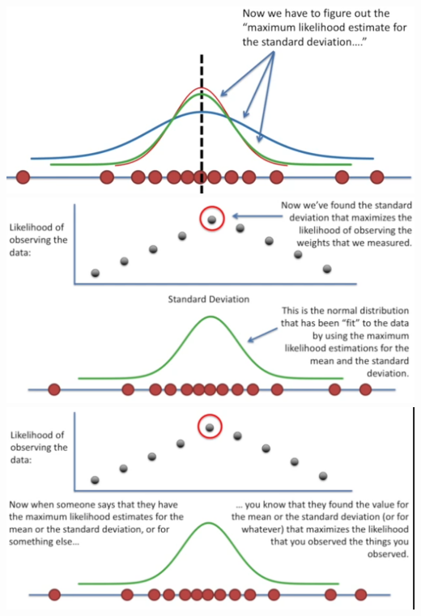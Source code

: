 \documentclass{beamer}
\begin{document}
\begin{frame}
	\includegraphics[scale=0.15]{figs/likelihoodsd}	\includegraphics[scale=0.15]{figs/likelihoodsd2}	\includegraphics[scale=0.15]{figs/likelihoodsd3}\\
\end{frame}
















\end{document}
